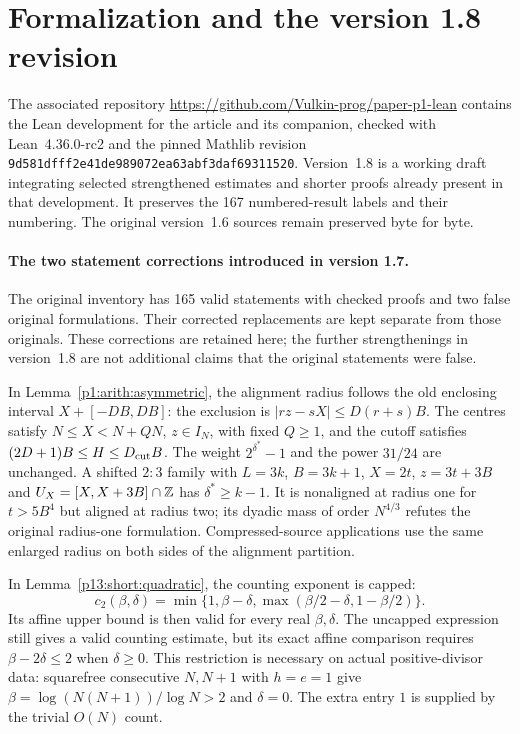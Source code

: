 \clearpage
\section*{Formalization and the version 1.8 revision}

The associated repository
\url{https://github.com/Vulkin-prog/paper-p1-lean}
contains the Lean development for the article and its companion,
checked with Lean~4.36.0-rc2 and the pinned Mathlib revision
\texttt{9d581dfff2e41de989072ea63abf3daf69311520}.
Version~1.8 is a working draft integrating selected strengthened
estimates and shorter proofs already present in that development.
It preserves the 167 numbered-result labels and their numbering.
The original version~1.6 sources remain preserved byte for byte.

\paragraph{The two statement corrections introduced in version 1.7.}
The original inventory has 165 valid statements with checked proofs
and two false original formulations. Their corrected replacements
are kept separate from those originals. These corrections are retained
here; the further strengthenings in version~1.8 are not additional
claims that the original statements were false.

In Lemma~\ref{p1:arith:asymmetric}, the alignment radius follows the
old enclosing interval $X+[-DB,DB]$: the exclusion is
$|rz-sX|\le D(r+s)B$. The centres satisfy
$N\le X<N+QN$, $z\in I_N$, with fixed $Q\ge1$, and the cutoff satisfies
$(2D+1)B\le H\le D_{\rm cut}B$. The weight $2^{\delta^*}-1$ and the
power $31/24$ are unchanged. A shifted $2:3$ family with
$L=3k$, $B=3k+1$, $X=2t$, $z=3t+3B$ and
$U_X=[X,X+3B]\cap\mathbb Z$ has $\delta^*\ge k-1$. It is nonaligned at
radius one for $t>5B^4$ but aligned at radius two; its dyadic mass
of order $N^{4/3}$ refutes the original radius-one formulation.
Compressed-source applications use the same enlarged radius on both
sides of the alignment partition.

In Lemma~\ref{p13:short:quadratic}, the counting exponent is capped:
\[
 c_2(\beta,\delta)
   =\min\{1,\beta-\delta,\max(\beta/2-\delta,1-\beta/2)\}.
\]
Its affine upper bound is then valid for every real $\beta,\delta$.
The uncapped expression still gives a valid counting estimate, but
its exact affine comparison requires $\beta-2\delta\le2$ when
$\delta\ge0$. This restriction is necessary on actual positive-divisor
data: squarefree consecutive $N,N+1$ with $h=e=1$ give
$\beta=\log(N(N+1))/\log N>2$ and $\delta=0$.
The extra entry $1$ is supplied by the trivial $O(N)$ count.

